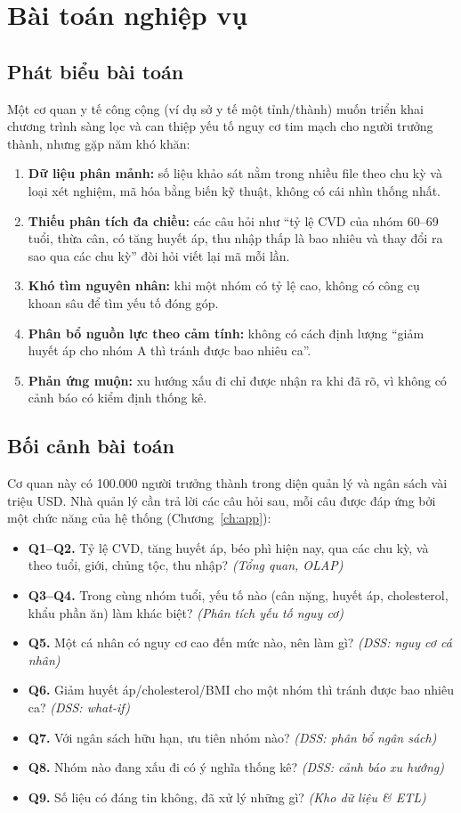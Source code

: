 \chapter{Bài toán nghiệp vụ}\label{ch:business}

\section{Phát biểu bài toán}
Một cơ quan y tế công cộng (ví dụ sở y tế một tỉnh/thành) muốn triển khai chương trình sàng lọc và can thiệp yếu tố nguy cơ tim mạch cho người trưởng thành, nhưng gặp năm khó khăn:
\begin{enumerate}
\item \textbf{Dữ liệu phân mảnh:} số liệu khảo sát nằm trong nhiều file theo chu kỳ và loại xét nghiệm, mã hóa bằng biến kỹ thuật, không có cái nhìn thống nhất.
\item \textbf{Thiếu phân tích đa chiều:} các câu hỏi như ``tỷ lệ CVD của nhóm 60--69 tuổi, thừa cân, có tăng huyết áp, thu nhập thấp là bao nhiêu và thay đổi ra sao qua các chu kỳ'' đòi hỏi viết lại mã mỗi lần.
\item \textbf{Khó tìm nguyên nhân:} khi một nhóm có tỷ lệ cao, không có công cụ khoan sâu để tìm yếu tố đóng góp.
\item \textbf{Phân bổ nguồn lực theo cảm tính:} không có cách định lượng ``giảm huyết áp cho nhóm A thì tránh được bao nhiêu ca''.
\item \textbf{Phản ứng muộn:} xu hướng xấu đi chỉ được nhận ra khi đã rõ, vì không có cảnh báo có kiểm định thống kê.
\end{enumerate}

\section{Bối cảnh bài toán}
Cơ quan này có 100.000 người trưởng thành trong diện quản lý và ngân sách vài triệu USD. Nhà quản lý cần trả lời các câu hỏi sau, mỗi câu được đáp ứng bởi một chức năng của hệ thống (Chương~\ref{ch:app}):
\begin{itemize}
\item \textbf{Q1--Q2.} Tỷ lệ CVD, tăng huyết áp, béo phì hiện nay, qua các chu kỳ, và theo tuổi, giới, chủng tộc, thu nhập? \emph{(Tổng quan, OLAP)}
\item \textbf{Q3--Q4.} Trong cùng nhóm tuổi, yếu tố nào (cân nặng, huyết áp, cholesterol, khẩu phần ăn) làm khác biệt? \emph{(Phân tích yếu tố nguy cơ)}
\item \textbf{Q5.} Một cá nhân có nguy cơ cao đến mức nào, nên làm gì? \emph{(DSS: nguy cơ cá nhân)}
\item \textbf{Q6.} Giảm huyết áp/cholesterol/BMI cho một nhóm thì tránh được bao nhiêu ca? \emph{(DSS: what-if)}
\item \textbf{Q7.} Với ngân sách hữu hạn, ưu tiên nhóm nào? \emph{(DSS: phân bổ ngân sách)}
\item \textbf{Q8.} Nhóm nào đang xấu đi có ý nghĩa thống kê? \emph{(DSS: cảnh báo xu hướng)}
\item \textbf{Q9.} Số liệu có đáng tin không, đã xử lý những gì? \emph{(Kho dữ liệu \& ETL)}
\end{itemize}

